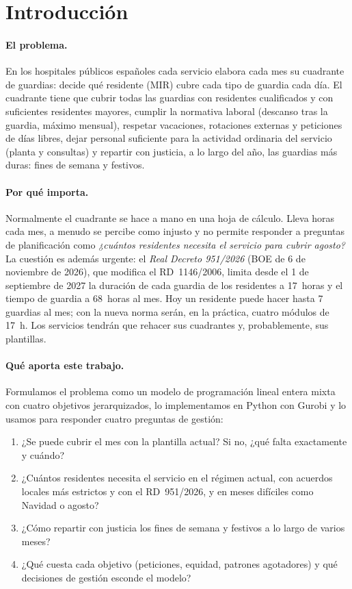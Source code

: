 \section{Introducción}
\label{sec:intro}

\paragraph{El problema.} En los hospitales públicos españoles cada servicio elabora cada mes su cuadrante de guardias: decide qué residente (MIR) cubre cada tipo de guardia cada día. El cuadrante tiene que cubrir todas las guardias con residentes cualificados y con suficientes residentes mayores, cumplir la normativa laboral (descanso tras la guardia, máximo mensual), respetar vacaciones, rotaciones externas y peticiones de días libres, dejar personal suficiente para la actividad ordinaria del servicio (planta y consultas) y repartir con justicia, a lo largo del año, las guardias más duras: fines de semana y festivos.

\paragraph{Por qué importa.} Normalmente el cuadrante se hace a mano en una hoja de cálculo. Lleva horas cada mes, a menudo se percibe como injusto y no permite responder a preguntas de planificación como \emph{¿cuántos residentes necesita el servicio para cubrir agosto?} La cuestión es además urgente: el \emph{Real Decreto 951/2026} (BOE de 6 de noviembre de 2026), que modifica el RD~1146/2006, limita desde el 1 de septiembre de 2027 la duración de cada guardia de los residentes a 17~horas y el tiempo de guardia a 68~horas al mes. Hoy un residente puede hacer hasta 7 guardias al mes; con la nueva norma serán, en la práctica, cuatro módulos de 17~h. Los servicios tendrán que rehacer sus cuadrantes y, probablemente, sus plantillas.

\paragraph{Qué aporta este trabajo.} Formulamos el problema como un modelo de programación lineal entera mixta con cuatro objetivos jerarquizados, lo implementamos en Python con Gurobi y lo usamos para responder cuatro preguntas de gestión:
\begin{enumerate}[label=\textbf{P\arabic*.}]
  \item ¿Se puede cubrir el mes con la plantilla actual? Si no, ¿qué falta exactamente y cuándo?
  \item ¿Cuántos residentes necesita el servicio en el régimen actual, con acuerdos locales más estrictos y con el RD~951/2026, y en meses difíciles como Navidad o agosto?
  \item ¿Cómo repartir con justicia los fines de semana y festivos a lo largo de varios meses?
  \item ¿Qué cuesta cada objetivo (peticiones, equidad, patrones agotadores) y qué decisiones de gestión esconde el modelo?
\end{enumerate}

